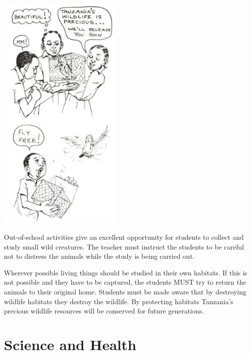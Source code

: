 \begin{multicols}{2}
\begin{center}
\includegraphics[width=0.45\textwidth]{./img/source/wildlife.jpg}
\end{center}

Out-of-school activities give an excellent
opportunity for students to collect and study
small wild creatures. The teacher must instruct
the students to be careful not to distress the
animals while the study is being carried out.

Wherever possible living things should be
studied in their own habitats. If this is not
possible and they have to be captured, the
students MUST try to return the animals to their
original home. Students must be made aware
that by destroying wildlife habitats they destroy
the wildlife. By protecting habitats Tanzania's
precious wildlife resources will be conserved
for future generations.


\section{Science and Health}


\end{multicols}
